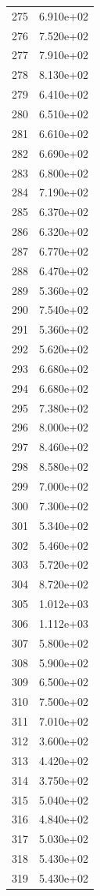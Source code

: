 \documentclass[12pt]{article}
\begin{document}
\begin{longtable}{@{}cc@{}}
275 & 6.910e+02 \\
276 & 7.520e+02 \\
277 & 7.910e+02 \\
278 & 8.130e+02 \\
279 & 6.410e+02 \\
280 & 6.510e+02 \\
281 & 6.610e+02 \\
282 & 6.690e+02 \\
283 & 6.800e+02 \\
284 & 7.190e+02 \\
285 & 6.370e+02 \\
286 & 6.320e+02 \\
287 & 6.770e+02 \\
288 & 6.470e+02 \\
289 & 5.360e+02 \\
290 & 7.540e+02 \\
291 & 5.360e+02 \\
292 & 5.620e+02 \\
293 & 6.680e+02 \\
294 & 6.680e+02 \\
295 & 7.380e+02 \\
296 & 8.000e+02 \\
297 & 8.460e+02 \\
298 & 8.580e+02 \\
299 & 7.000e+02 \\
300 & 7.300e+02 \\
301 & 5.340e+02 \\
302 & 5.460e+02 \\
303 & 5.720e+02 \\
304 & 8.720e+02 \\
305 & 1.012e+03 \\
306 & 1.112e+03 \\
307 & 5.800e+02 \\
308 & 5.900e+02 \\
309 & 6.500e+02 \\
310 & 7.500e+02 \\
311 & 7.010e+02 \\
312 & 3.600e+02 \\
313 & 4.420e+02 \\
314 & 3.750e+02 \\
315 & 5.040e+02 \\
316 & 4.840e+02 \\
317 & 5.030e+02 \\
318 & 5.430e+02 \\
319 & 5.430e+02 \\

\end{longtable}
\end{document}
